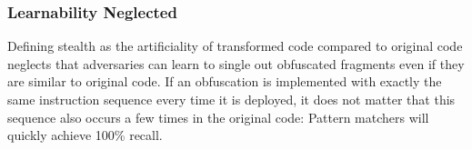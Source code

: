 \subsubsection{Learnability Neglected}
\label{sec:learnability_missing}
Defining stealth as the artificiality of transformed code compared to original code neglects that adversaries can learn to single out obfuscated fragments even if they are similar to original code. If an obfuscation is implemented with exactly the same instruction sequence every time it is deployed, it does not matter that this sequence also occurs a few times in the original code: Pattern matchers will quickly achieve 100\% recall.
